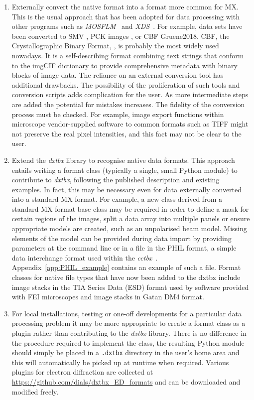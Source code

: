\documentclass[preprint]{iucr}
\newcommand{\cctbx}{\emph{cctbx}\xspace}
\newcommand{\dxtbx}{\emph{dxtbx}\xspace}
\newcommand{\code}{\texttt}
\newcommand{\xds}{\emph{XDS}\xspace}
\newcommand{\mosflm}{\emph{MOSFLM}\xspace}
\begin{document}
\begin{enumerate}
  \item Externally convert the native format into a format more common for MX.
  This is the usual approach that has been adopted for data processing with
  other programs such as \mosflm~\cite{leslie2007} and
  \xds~\cite{kabsch2010xds}. For example, data sets have been converted to SMV
  \cite{Hattne2015}, PCK images \cite{Clabbers2017}, or CBF {Gruene2018}.  CBF, the
  Crystallographic Binary Format, \cite{Bernstein2005}, is probably the most
  widely used nowadays. It is a self-describing format combining text strings
  that conform to the imgCIF dictionary to provide comprehensive metadata with
  binary blocks of image data. The reliance on an external conversion tool has
  additional drawbacks.  The possibility of the proliferation of such tools and
  conversion scripts adds complication for the user. As more intermediate steps
  are added the potential for mistakes increases. The fidelity of the conversion
  process must be checked. For example, image export functions within microscope
  vendor-supplied software to common formats such as TIFF might not preserve
  the real pixel intensities, and this fact may not be clear to the user.

  \item Extend the \dxtbx library to recognise native data formats. This
  approach entails writing a format class (typically a single, small Python
  module) to contribute to \dxtbx, following the published description
  \cite{Parkhurst2014} and existing examples. In fact, this may be necessary
  even for data externally converted into a standard MX format. For example, a
  new class derived from a standard MX format base class may be required in
  order to define a mask for certain regions of the images, split a data array
  into multiple panels or ensure appropriate models are created, such as an
  unpolarised beam model. Missing elements of the model can be provided during
  data import by providing parameters at the command line or in a file in the
  PHIL format, a simple data interchange format used within the
  \cctbx~\cite{Grosse-Kunstleve2002}. Appendix~\ref{app:PHIL_example} contains
  an example of such a file. Format classes for native file types that have now
  been added to the dxtbx include image stacks in the TIA Series Data (ESD)
  format used by software provided with FEI microscopes and image stacks in
  Gatan DM4 format.

  \item For local installations, testing or one-off developments for a
  particular data processing problem it may be more appropriate to create a
  format class as a plugin rather than contributing to the \dxtbx library.
  There is no difference in the procedure required to implement the class, the
  resulting Python module should simply be placed in a \code{.dxtbx} directory
  in the user's home area and this will automatically be picked up at runtime
  when required. Various plugins for electron diffraction are collected at
  \url{https://github.com/dials/dxtbx_ED_formats} and can be downloaded and
  modified freely.

\end{enumerate}
\end{document}
